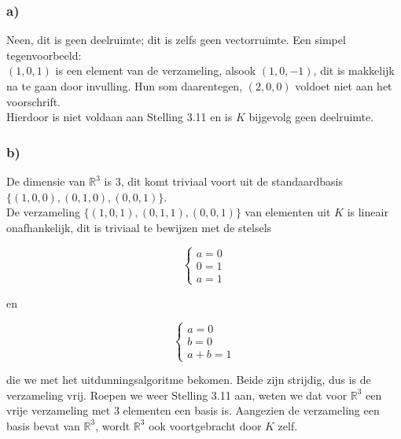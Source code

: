 \documentclass[lineaire_algebra_oplossingen.tex]{subfiles}
\begin{document}
\subsubsection*{a)}
Neen, dit is geen deelruimte; dit is zelfs geen vectorruimte. Een simpel tegenvoorbeeld:\\

$(1,0,1)$ is een element van de verzameling, alsook $(1,0,-1)$, dit is makkelijk na te gaan door invulling. Hun som daarentegen, $(2,0,0)$ voldoet niet aan het voorschrift.\\

Hierdoor is niet voldaan aan Stelling 3.11 en is $K$ bijgevolg geen deelruimte.

\subsubsection*{b)}

De dimensie van $\mathbb{R}^3$ is 3, dit komt triviaal voort uit de standaardbasis $\{(1,0,0),(0,1,0),(0,0,1)\}$.\\

De verzameling $\{(1,0,1),(0,1,1),(0,0,1)\}$ van elementen uit $K$ is lineair onafhankelijk, dit is triviaal te bewijzen met de stelsels

\[
\left\{
\begin{array}{l}
a = 0\\
0 = 1\\
a = 1
\end{array} \right.
\]

en

\[
\left\{
\begin{array}{l}
a = 0\\
b = 0\\
a + b = 1
\end{array} \right.
\]

die we met het uitdunningsalgoritme bekomen. Beide zijn strijdig, dus is de verzameling vrij. Roepen we weer Stelling 3.11 aan, weten we dat voor $\mathbb{R}^3$ een vrije verzameling met 3 elementen een basis is. Aangezien de verzameling een basis bevat van $\mathbb{R}^3$, wordt $\mathbb{R}^3$ ook voortgebracht door $K$ zelf.
\end{document}
